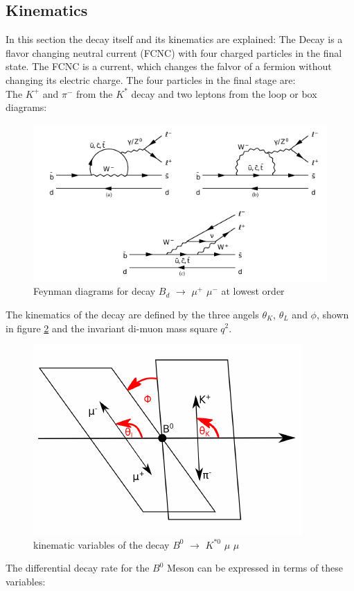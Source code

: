 \documentclass[english]{uzhpub}
\begin{document}
 \subsection{Kinematics} \label{sec:Kinematics}
 In this section the decay itself and its kinematics are explained:
 The Decay is a flavor changing neutral current (FCNC) with four charged particles in the final state. The FCNC is a current, which changes the falvor of a fermion without changing its electric charge. The four particles in the final stage are:  \\
 The $K^+$ and $\pi^-$ from the $K^{*}$ decay and two leptons from the loop or box diagrams:
 \begin{figure}[H]
  \centering
  \includegraphics[width=0.8\linewidth]{KstarFeynman}
  \caption{Feynman diagrams for decay $B_d$ $\rightarrow$ $\mu^+$ $\mu^-$ at lowest order}
  \label{fig:Feynman}
 \end{figure}
 The kinematics of the decay are defined by the three angels $\theta_K$, $\theta_L$ and $\phi$, shown in figure \ref{fig:angels} and the invariant di-muon mass square $q^2$.
 \begin{figure}[H]
  \centering
  \includegraphics[width=0.6\linewidth]{angels}
  \caption{kinematic variables of the decay $B^0$ $\rightarrow$ $K^{*0}$ $\mu$ $\mu$}
  \label{fig:angels}
 \end{figure}
The differential decay rate for the $B^0$ Meson can be expressed in terms of these variables:
\end{document}
